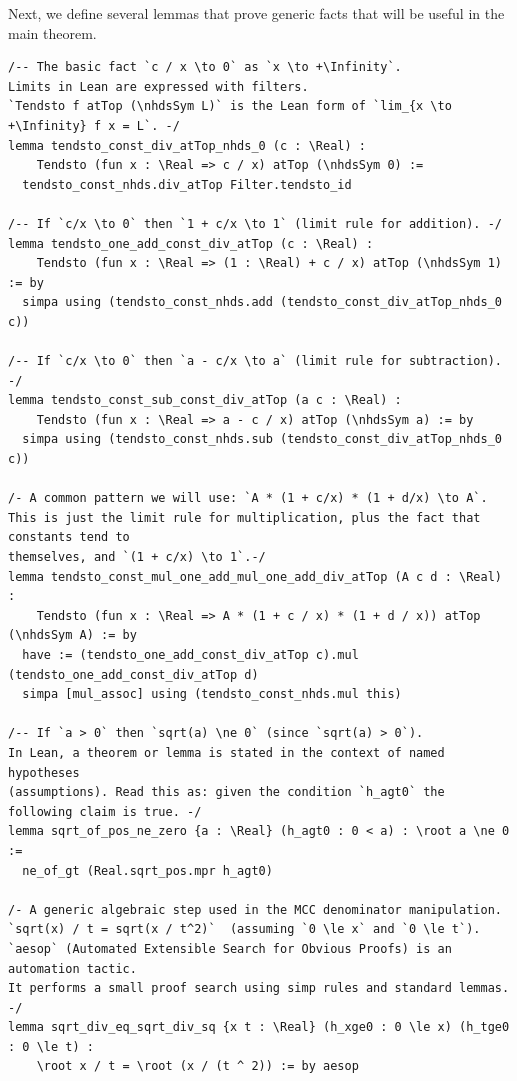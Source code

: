 \documentclass{article}
\begin{document}
Next, we define several lemmas that prove generic facts that will be useful in
the main theorem.

\begin{lstlisting}[language=lean, firstnumber=last]
/-- The basic fact `c / x \to 0` as `x \to +\Infinity`.
Limits in Lean are expressed with filters.
`Tendsto f atTop (\nhdsSym L)` is the Lean form of `lim_{x \to +\Infinity} f x = L`. -/
lemma tendsto_const_div_atTop_nhds_0 (c : \Real) :
    Tendsto (fun x : \Real => c / x) atTop (\nhdsSym 0) :=
  tendsto_const_nhds.div_atTop Filter.tendsto_id

/-- If `c/x \to 0` then `1 + c/x \to 1` (limit rule for addition). -/
lemma tendsto_one_add_const_div_atTop (c : \Real) :
    Tendsto (fun x : \Real => (1 : \Real) + c / x) atTop (\nhdsSym 1) := by
  simpa using (tendsto_const_nhds.add (tendsto_const_div_atTop_nhds_0 c))

/-- If `c/x \to 0` then `a - c/x \to a` (limit rule for subtraction). -/
lemma tendsto_const_sub_const_div_atTop (a c : \Real) :
    Tendsto (fun x : \Real => a - c / x) atTop (\nhdsSym a) := by
  simpa using (tendsto_const_nhds.sub (tendsto_const_div_atTop_nhds_0 c))

/- A common pattern we will use: `A * (1 + c/x) * (1 + d/x) \to A`.
This is just the limit rule for multiplication, plus the fact that constants tend to
themselves, and `(1 + c/x) \to 1`.-/
lemma tendsto_const_mul_one_add_mul_one_add_div_atTop (A c d : \Real) :
    Tendsto (fun x : \Real => A * (1 + c / x) * (1 + d / x)) atTop (\nhdsSym A) := by
  have := (tendsto_one_add_const_div_atTop c).mul (tendsto_one_add_const_div_atTop d)
  simpa [mul_assoc] using (tendsto_const_nhds.mul this)

/-- If `a > 0` then `sqrt(a) \ne 0` (since `sqrt(a) > 0`).
In Lean, a theorem or lemma is stated in the context of named hypotheses
(assumptions). Read this as: given the condition `h_agt0` the following claim is true. -/
lemma sqrt_of_pos_ne_zero {a : \Real} (h_agt0 : 0 < a) : \root a \ne 0 :=
  ne_of_gt (Real.sqrt_pos.mpr h_agt0)

/- A generic algebraic step used in the MCC denominator manipulation.
`sqrt(x) / t = sqrt(x / t^2)`  (assuming `0 \le x` and `0 \le t`).
`aesop` (Automated Extensible Search for Obvious Proofs) is an automation tactic.
It performs a small proof search using simp rules and standard lemmas. -/
lemma sqrt_div_eq_sqrt_div_sq {x t : \Real} (h_xge0 : 0 \le x) (h_tge0 : 0 \le t) :
    \root x / t = \root (x / (t ^ 2)) := by aesop
\end{lstlisting}
\end{document}
